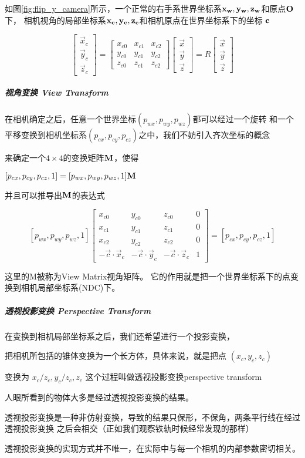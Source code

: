 

如图\ref{fig:flip_y_camera}所示，一个正常的右手系世界坐标系$\bf{x_w,y_w,z_w}$和原点$\bf{O}$下，
相机视角的局部坐标系$\bf{x_c,y_c,z_c}$和相机原点在世界坐标系下的坐标 $\bf{c}$

$$\left[\begin{matrix} 
    \vec{x}_c \\ \vec{y}_c \\ \vec{z}_c 
\end{matrix}\right]=
\left[\begin{matrix} 
    x_{c0} & x_{c1} & x_{c2} \\ 
    y_{c0} & y_{c1} & y_{c2} \\ 
    z_{c0} & z_{c1} & z_{c2} 
\end{matrix}\right]
\left[\begin{matrix} 
    \vec{x} \\ \vec{y} \\ \vec{z} 
\end{matrix}\right]=
R\left[\begin{matrix} 
    \vec{x} \\ \vec{y} \\ \vec{z} 
\end{matrix}\right]$$

\subparagraph{视角变换 View Transform}

在相机确定之后，任意一个世界坐标$(p_{wx},p_{wy},p_{wz})$都可以经过一个旋转
和一个平移变换到相机坐标系$(p_{cx},p_{cy},p_{cz})$之中，我们不妨引入齐次坐标的概念

来确定一个$4\times 4$的变换矩阵$\bf{M}$，使得

$[p_{cx},p_{cy},p_{cz},1]=[p_{wx},p_{wy},p_{wz},1]\bf{M}$

并且可以推导出$\bf{M}$的表达式

$$[p_{wx},p_{wy},p_{wz},1]
\left[\begin{matrix} 
    x_{c0} & y_{c0} & z_{c0} & 0 \\ 
    x_{c1} & y_{c1} & z_{c1} & 0 \\ 
    x_{c2} & y_{c2} & z_{c2} & 0 \\ 
    -\vec{c}\cdot\vec{x}_c &-\vec{c}\cdot\vec{y}_c &-\vec{c}\cdot\vec{z}_c & 1 
\end{matrix}\right]=[p_{cx},p_{cy},p_{cz}, 1]$$


这里的M被称为View Matrix视角矩阵。
它的作用就是把一个世界坐标系下的点变换到相机局部坐标系(NDC)下。

\subparagraph{透视投影变换 Perspective Transform}

在变换到相机局部坐标系之后，我们还希望进行一个投影变换，

把相机所包括的锥体变换为一个长方体，具体来说，就是把点 $(x_c,y_c,z_c)$

变换为 $x_c/z_c, y_c/z_c, z_c$ 这个过程叫做透视投影变换perspective transform

人眼所看到的物体大多是经过透视投影变换的结果。

透视投影变换是一种非仿射变换，导致的结果只保形，不保角，两条平行线在经过透视投影变换
之后会相交（正如我们观察铁轨时候经常发现的那样）

透视投影变换的实现方式并不唯一，在实际中与每一个相机的内部参数密切相关。

